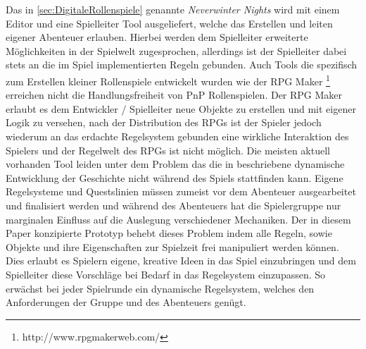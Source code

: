 Das in \ref{sec:DigitaleRollenspiele} genannte \emph{Neverwinter Nights} wird mit einem Editor und eine Spielleiter Tool ausgeliefert, welche das Erstellen und leiten eigener Abenteuer erlauben. Hierbei werden dem Spielleiter erweiterte Möglichkeiten in der Spielwelt zugesprochen, allerdings ist der Spielleiter dabei stets an die im Spiel implementierten Regeln gebunden. \cite{Tychsen2006a}\newline
Auch Tools die spezifisch zum Erstellen kleiner Rollenspiele entwickelt wurden wie der RPG Maker \footnote{http://www.rpgmakerweb.com/} erreichen nicht die Handlungsfreiheit von PnP Rollenspielen. Der RPG Maker erlaubt es dem Entwickler / Spielleiter neue Objekte zu erstellen und mit eigener Logik zu versehen, nach der Distribution des RPGs ist der Spieler jedoch wiederum an das erdachte Regelsystem gebunden eine wirkliche Interaktion des Spielers und der Regelwelt des RPGs ist nicht möglich.\newline
Die meisten aktuell vorhanden Tool leiden unter dem Problem das die in \cite{Arinbjarnar} beschriebene dynamische Entwicklung der Geschichte nicht während des Spiels stattfinden kann. Eigene Regelsysteme und Questslinien müssen zumeist vor dem Abenteuer ausgearbeitet und finalisiert werden und während des Abenteuers hat die Spielergruppe nur marginalen Einfluss auf die Auslegung verschiedener Mechaniken.\newline
Der in diesem Paper konzipierte Prototyp behebt dieses Problem indem alle Regeln, sowie Objekte und ihre Eigenschaften zur Spielzeit frei manipuliert werden können. Dies erlaubt es Spielern eigene, kreative Ideen in das Spiel einzubringen und dem Spielleiter diese Vorschläge bei Bedarf in das Regelsystem einzupassen. So erwächst bei jeder Spielrunde ein dynamische Regelsystem, welches den Anforderungen der Gruppe und des Abenteuers genügt.